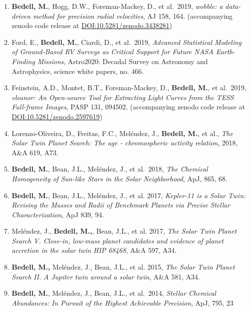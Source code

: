 \documentclass[letter,12pt]{article} %
\begin{document}
\begin{enumerate}
\item \textbf{Bedell, M.}, Hogg, D.W., Foreman-Mackey, D., et al.\ 2019, \textit{wobble: a data-driven method for precision radial velocities}, AJ 158, 164. 
(accompanying zenodo code release at \href{https://doi.org/10.5281/zenodo.3438281}{DOI:10.5281/zenodo.3438281})

\item Ford, E., \textbf{Bedell, M.}, Ciardi, D., et al.\ 2019, \textit{Advanced Statistical Modeling of Ground-Based RV Surveys as Critical Support for Future NASA Earth-Finding Missions}, Astro2020: Decadal Survey on Astronomy and Astrophysics, science white papers, no. 466.

\item Feinstein, A.D., Montet, B.T., Foreman-Mackey, D., \textbf{Bedell, M.}, et al.\ 2019, \textit{eleanor: An Open-source Tool for Extracting Light Curves from the TESS Full-frame Images}, PASP 131, 094502. 
(accompanying zenodo code release at \href{https://doi.org/10.5281/zenodo.2597619}{DOI:10.5281/zenodo.2597619})

\item Lorenzo-Oliveira, D., Freitas, F.C., Mel{\'e}ndez, J., \textbf{Bedell, M.}, et al., \textit{The Solar Twin Planet Search: The age - chromospheric activity relation}, 2018, A\&A 619, A73.

\item \textbf{Bedell, M.}, Bean, J.L., Mel{\'e}ndez, J., et al.\ 2018, \textit{The Chemical Homogeneity of Sun-like Stars in the Solar Neighborhood}, ApJ, 865, 68.

\item \textbf{Bedell, M.}, Bean, J.L., Mel\'{e}ndez, J., et al. 2017, \textit{Kepler-11 is a Solar Twin: Revising the Masses and Radii of Benchmark Planets via Precise Stellar Characterization}, ApJ 839, 94.

\item Mel{\'e}ndez, J., \textbf{Bedell, M.,}, Bean, J.L., et al. 2017, \textit{The Solar Twin Planet Search V. Close-in, low-mass planet candidates and evidence of planet accretion in the solar twin HIP 68468}, A\&A 597, A34.

\item \textbf{Bedell, M.,} Mel\'{e}ndez, J., Bean, J.L., et al. 2015, \textit{The Solar Twin Planet Search II. A Jupiter twin around a solar twin}, A\&A 581, A34.

\item \textbf{Bedell, M.}, Mel{\'e}ndez, J., Bean, J.L., et al.\ 2014, \textit{Stellar Chemical Abundances: In Pursuit of the Highest Achievable Precision}, ApJ, 795, 23

\end{enumerate}
\end{document}

